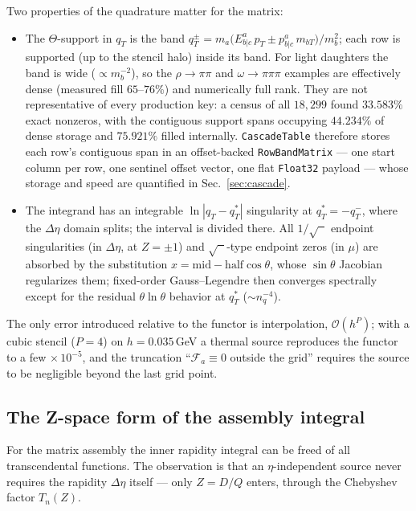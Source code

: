 \documentclass[11pt]{article}
\newcommand{\Fa}{\mathcal{F}_a}
\begin{document}
Two properties of the quadrature matter for the matrix:
\begin{itemize}
\item The $\Theta$-support in $q_T$ is the band
$q_T^{\pm}=m_a\big(E^a_{b|c}\,p_T\pm p^a_{b|c}\,m_{bT}\big)/m_b^2$;
each row is supported (up to the stencil halo) inside its band.
For light daughters the band is wide ($\propto m_b^{-2}$), so the
$\rho\to\pi\pi$ and $\omega\to\pi\pi\pi$ examples are effectively dense
(measured fill $65$--$76\%$) and numerically full rank.  They are not
representative of every production key: a census of all $18{,}299$ found
$33.583\%$ exact nonzeros, with the contiguous support spans occupying
$44.234\%$ of dense storage and $75.921\%$ filled internally.
\texttt{CascadeTable} therefore stores each row's contiguous span in an
offset-backed \texttt{RowBandMatrix} --- one start column per row, one
sentinel offset vector, one flat \texttt{Float32} payload --- whose storage
and speed are quantified in Sec.~\ref{sec:cascade}.
\item The integrand has an integrable $\ln|q_T-q_T^{*}|$ singularity at
$q_T^{*}=-q_T^-$, where the $\Delta\eta$ domain splits; the interval is
divided there.  All $1/\sqrt{\phantom{x}}$ endpoint singularities (in
$\Delta\eta$, at $Z=\pm1$) and $\sqrt{\phantom{x}}$-type endpoint zeros (in
$\mu$) are absorbed by the substitution $x=\mathrm{mid}-\mathrm{half}\cos\theta$,
whose $\sin\theta$ Jacobian regularizes them; fixed-order Gauss--Legendre
then converges spectrally except for the residual
$\theta\ln\theta$ behavior at $q_T^{*}$ ($\sim n_q^{-4}$).
\end{itemize}
The only error introduced relative to the functor is interpolation,
$\mathcal O(h^P)$; with a cubic stencil ($P=4$) on $h=0.035$\,GeV a
thermal source reproduces the functor to a few$\,\times10^{-5}$, and the
truncation ``$\Fa\equiv0$ outside the grid'' requires the source to be
negligible beyond the last grid point.

\subsection{The Z-space form of the assembly integral}
\label{sec:zspace}

For the matrix assembly the inner rapidity integral can be freed of all
transcendental functions.  The observation is that an $\eta$-independent
source never requires the rapidity $\Delta\eta$ itself --- only
$Z=D/Q$ enters, through the Chebyshev factor $T_n(Z)$.
\end{document}
